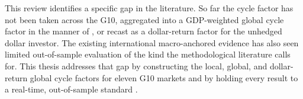 This review identifies a specific gap in the literature. So far the
\citet{cieslak2015} cycle factor has not been taken across the G10, aggregated
into a GDP-weighted global cycle factor in the manner of \citet{dahlquist2013},
or recast as a dollar-return factor for the unhedged dollar investor.
The existing international macro-anchored evidence has also seen
limited out-of-sample evaluation of the kind the methodological literature
calls for. This thesis addresses that gap by constructing the local, global,
and dollar-return global cycle factors for eleven G10 markets and by holding
every result to a real-time, out-of-sample standard
\citep{campbellthompson2008}.
